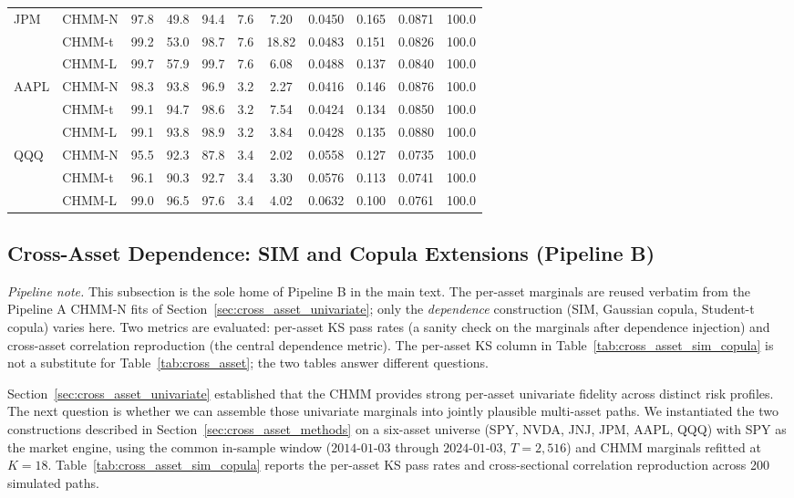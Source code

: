 \begin{table}[t]
{\begin{tabular}{l l cc c cc c c c c}
JPM  & CHMM-N & 97.8 & 49.8 & 94.4 & 7.6 & 7.20  & 0.0450 & 0.165 & 0.0871 & 100.0 \\
     & CHMM-t & 99.2 & 53.0 & 98.7 & 7.6 & 18.82 & 0.0483 & 0.151 & 0.0826 & 100.0 \\
     & CHMM-L & 99.7 & 57.9 & 99.7 & 7.6 & 6.08  & 0.0488 & 0.137 & 0.0840 & 100.0 \\
\midrule
AAPL & CHMM-N & 98.3 & 93.8 & 96.9 & 3.2 & 2.27  & 0.0416 & 0.146 & 0.0876 & 100.0 \\
     & CHMM-t & 99.1 & 94.7 & 98.6 & 3.2 & 7.54  & 0.0424 & 0.134 & 0.0850 & 100.0 \\
     & CHMM-L & 99.1 & 93.8 & 98.9 & 3.2 & 3.84  & 0.0428 & 0.135 & 0.0880 & 100.0 \\
\midrule
QQQ  & CHMM-N & 95.5 & 92.3 & 87.8 & 3.4 & 2.02  & 0.0558 & 0.127 & 0.0735 & 100.0 \\
     & CHMM-t & 96.1 & 90.3 & 92.7 & 3.4 & 3.30  & 0.0576 & 0.113 & 0.0741 & 100.0 \\
     & CHMM-L & 99.0 & 96.5 & 97.6 & 3.4 & 4.02  & 0.0632 & 0.100 & 0.0761 & 100.0 \\
\bottomrule
\end{tabular}%
}
\end{table}

\subsection{Cross-Asset Dependence: SIM and Copula Extensions (Pipeline B)}
\label{sec:cross_asset}

\emph{Pipeline note.} This subsection is the sole home of Pipeline B in the main text. The per-asset marginals are reused verbatim from the Pipeline A CHMM-N fits of Section~\ref{sec:cross_asset_univariate}; only the \emph{dependence} construction (SIM, Gaussian copula, Student-t copula) varies here. Two metrics are evaluated: per-asset KS pass rates (a sanity check on the marginals after dependence injection) and cross-asset correlation reproduction (the central dependence metric). The per-asset KS column in Table~\ref{tab:cross_asset_sim_copula} is not a substitute for Table~\ref{tab:cross_asset}; the two tables answer different questions.

Section~\ref{sec:cross_asset_univariate} established that the CHMM provides strong per-asset univariate fidelity across distinct risk profiles.
The next question is whether we can assemble those univariate marginals into jointly plausible multi-asset paths.
We instantiated the two constructions described in Section~\ref{sec:cross_asset_methods} on a six-asset universe (SPY, NVDA, JNJ, JPM, AAPL, QQQ) with SPY as the market engine, using the common in-sample window ($2014$-$01$-$03$ through $2024$-$01$-$03$, $T = 2{,}516$) and CHMM marginals refitted at $K = 18$.
Table~\ref{tab:cross_asset_sim_copula} reports the per-asset KS pass rates and cross-sectional correlation reproduction across 200 simulated paths.

